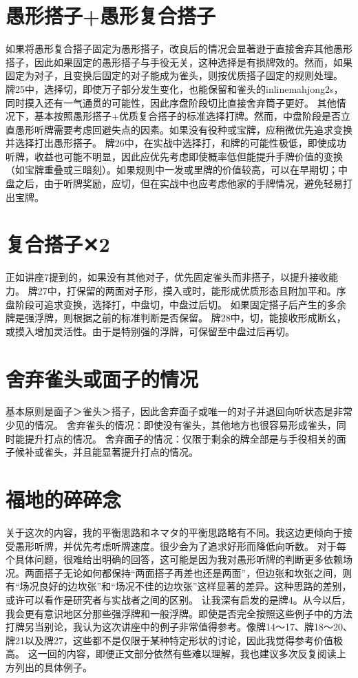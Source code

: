 \section{愚形搭子+愚形复合搭子}
如果将愚形复合搭子固定为愚形搭子，改良后的情况会显著逊于直接舍弃其他愚形搭子，因此如果固定的愚形搭子与手役无关，这种选择是有损牌效的。然而，如果固定为对子，且变换后固定的对子能成为雀头，则按优质搭子固定的规则处理。
牌25中，选择切，即使万子部分发生变化，也能保留和雀头的inlinemahjong{2s}，同时摸入还有一气通贯的可能性，因此序盘阶段切比直接舍弃筒子更好。
其他情况下，基本按照愚形搭子+优质复合搭子的标准选择打牌。然而，中盘阶段是否立直愚形听牌需要考虑回避失点的因素。如果没有役种或宝牌，应稍微优先追求变换并选择打出愚形搭子。
牌26中，在实战中选择打，和牌的可能性极低，即使成功听牌，收益也可能不明显，因此应优先考虑即使概率低但能提升手牌价值的变换（如宝牌重叠或三暗刻）。如果规则中一发或里牌的价值较高，可以在早期切；中盘之后，由于听牌奖励，应切，但在实战中也应考虑他家的手牌情况，避免轻易打出宝牌。

\section{复合搭子✕2}
正如讲座7提到的，如果没有其他对子，优先固定雀头而非搭子，以提升接收能力。
牌27中，打保留的两面对子形，摸入或时，能形成优质形态且附加平和。序盘阶段可追求变换，选择打，中盘切，中盘过后切。
如果固定搭子后产生的多余牌是强浮牌，则根据之前的标准判断是否保留。
牌28中，切，能接收形成断幺，或摸入增加灵活性。由于是特别强的浮牌，可保留至中盘过后再切。

\section{舍弃雀头或面子的情况}
基本原则是面子＞雀头＞搭子，因此舍弃面子或唯一的对子并退回向听状态是非常少见的情况。
舍弃雀头的情况：即使没有雀头，其他地方也很容易形成雀头，同时能提升打点的情况。
舍弃面子的情况：仅限于剩余的牌全部是与手役相关的面子候补或雀头，并且能显著提升打点的情况。

\section{福地的碎碎念}
关于这次的内容，我的平衡思路和ネマタ的平衡思路略有不同。我这边更倾向于接受愚形听牌，并优先考虑听牌速度。很少会为了追求好形而降低向听数。
对于每个具体问题，很难给出明确的回答，这可能是因为我对愚形听牌的判断更多依赖场况。两面搭子无论如何都保持“两面搭子再差也还是两面”，但边张和坎张之间，则有“场况良好的边坎张”和“场况不佳的边坎张”这样显著的差异。这种思路的差别，或许可以看作是研究者与实战者之间的区别。
让我深有启发的是牌4。从今以后，我会更有意识地区分那些强浮牌和一般浮牌。即使是否完全按照这些例子中的方法打牌另当别论，我认为这次讲座中的例子非常值得参考。像牌14～17、牌18～20、牌21以及牌27，这些都不是仅限于某种特定形状的讨论，因此我觉得参考价值极高。
这一回的内容，即便正文部分依然有些难以理解，我也建议多次反复阅读上方列出的具体例子。